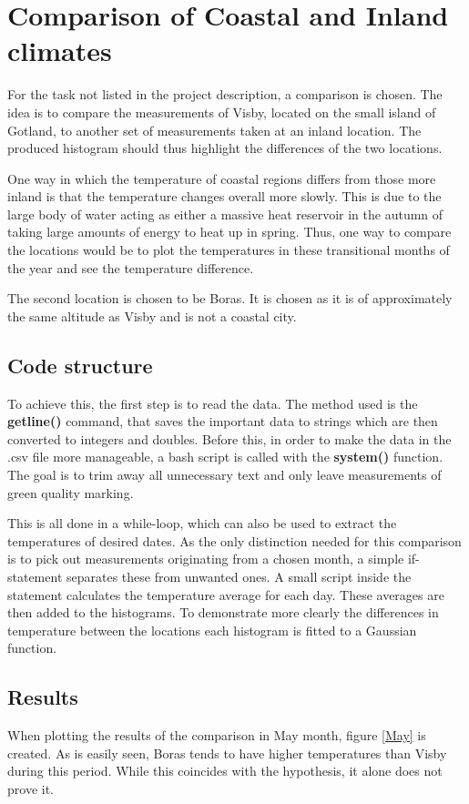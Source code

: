 
\section{Comparison of Coastal and Inland climates}
For the task not listed in the project description, a comparison is chosen. The idea is to compare the measurements of Visby, located on the small island of Gotland, to another set of measurements taken at an inland location. The produced histogram should thus highlight the differences of the two locations.

One way in which the temperature of coastal regions differs from those more inland is that the temperature changes overall more slowly. This is due to the large body of water acting as either a massive heat reservoir in the autumn of taking large amounts of energy to heat up in spring. Thus, one way to compare the locations would be to plot the temperatures in these transitional months of the year and see the temperature difference.

The second location is chosen to be Boras. It is chosen as it is of approximately the same altitude as Visby and is not a coastal city.

\subsection{Code structure}
To achieve this, the first step is to read the data. The method used is the \textbf{getline()} command, that saves the important data to strings which are then converted to integers and doubles. Before this, in order to make the data in the .csv file more manageable, a bash script is called with the \textbf{system()} function. The goal is to trim away all unnecessary text and only leave measurements of green quality marking.

This is all done in a while-loop, which can also be used to extract the temperatures of desired dates. As the only distinction needed for this comparison is to pick out measurements originating from a chosen month, a simple if-statement separates these from unwanted ones. A small script inside the statement calculates the temperature average for each day. These averages are then added to the histograms. To demonstrate more clearly the differences in temperature between the locations each histogram is fitted to a Gaussian function.

\subsection{Results}
When plotting the results of the comparison in May month, figure \ref{May} is created. As is easily seen, Boras tends to have higher temperatures than Visby during this period. While this coincides with the hypothesis, it alone does not prove it. 

